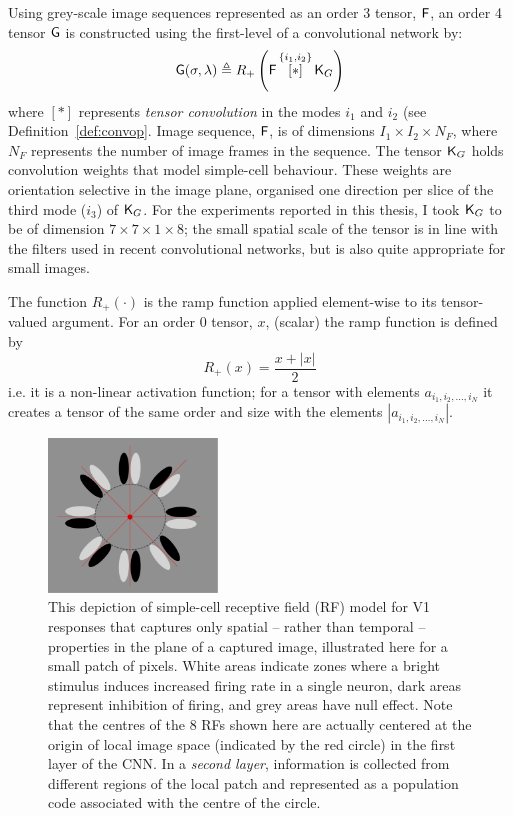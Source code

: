 Using grey-scale image sequences represented as an order 3 tensor, $\mathsf{F}$, an order 4 tensor $\mathsf{G}$ is constructed using the first-level of a convolutional network by:
\begin{equation}
\mathsf{G}(\sigma,\lambda) \triangleq R_+ \left ( \mathsf{F} \, \overset{\lbrace i_1,i_2\rbrace}{[ \ast ]}\, {\mathsf{K}_{G}} \right )
\end{equation}
where $[ \ast ]$ represents \textit{tensor convolution} in the modes $i_1$ and $i_2$ (see Definition~\ref{def:convop}. Image sequence, $\mathsf{F}$, is of dimensions $I_1\times I_2 \times N_F$, where $N_F$ represents the number of image frames in the sequence. The tensor $\mathsf{K}_{G}$ holds convolution weights that model simple-cell behaviour. These weights are orientation selective in the image plane, organised one direction per slice of the third mode ($i_3$) of $\mathsf{K}_{G}$. For the experiments reported in this thesis, I took $\mathsf{K}_{G}$ to be of dimension $7 \times 7 \times 1\times 8$; the small spatial scale of the tensor is in line with the filters used in recent convolutional networks, but is also quite appropriate for small images.

The function $R_+(\cdot)$ is the ramp function applied element-wise to its tensor-valued argument. For an order 0 tensor, $x$, (scalar) the ramp function is defined by
\begin{equation}
R_+(x) = \frac{x + |x|}{2}
\end{equation}
i.e. it is a non-linear activation function; for a tensor with elements $a_{i_1,i_2,...,i_N}$ it creates a tensor of the same order and size with the elements $|a_{i_1,i_2,...,i_N}|$. 

\begin{figure}
\begin{center}
\includegraphics[width=4.5cm]{gfx/Chapter05/OrientedGabors.pdf}
\caption{This depiction of simple-cell receptive field (RF) model for V1 responses that captures only spatial -- rather than temporal -- properties in the plane of a captured image, illustrated here for a small patch of pixels. White areas indicate zones where a bright stimulus induces increased firing rate in a single neuron, dark areas represent inhibition of firing, and grey areas have null effect.  Note that the centres of the 8 RFs shown here are actually centered at the origin of local image space (indicated by the red circle) in the first layer of the CNN.  In a {\em second layer}, information is collected from different regions of the local patch and represented as a population code associated with the centre of the circle.}
\label{fig:OG}
\end{center}
\end{figure}

